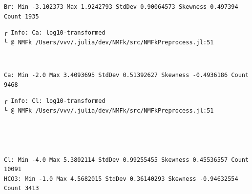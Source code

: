 \documentclass[11pt]{article}
\begin{document}
    \begin{Verbatim}[commandchars=\\\{\}]
Br: Min -3.102373 Max 1.9242793 StdDev 0.90064573 Skewness 0.497394 Count 1935
    \end{Verbatim}

    \begin{Verbatim}[commandchars=\\\{\}]
┌ Info: Ca: log10-transformed
└ @ NMFk /Users/vvv/.julia/dev/NMFk/src/NMFkPreprocess.jl:51
    \end{Verbatim}

    \begin{center}
    \end{center}
    { \hspace*{\fill} \\}

    \begin{Verbatim}[commandchars=\\\{\}]
Ca: Min -2.0 Max 3.4093695 StdDev 0.51392627 Skewness -0.4936186 Count 9468
    \end{Verbatim}

    \begin{Verbatim}[commandchars=\\\{\}]
┌ Info: Cl: log10-transformed
└ @ NMFk /Users/vvv/.julia/dev/NMFk/src/NMFkPreprocess.jl:51
    \end{Verbatim}

    \begin{center}
    \end{center}
    { \hspace*{\fill} \\}

    \begin{center}
    \end{center}
    { \hspace*{\fill} \\}

    \begin{Verbatim}[commandchars=\\\{\}]
Cl: Min -4.0 Max 5.3802114 StdDev 0.99255455 Skewness 0.45536557 Count 10091
HCO3: Min -1.0 Max 4.5682015 StdDev 0.36140293 Skewness -0.94632554 Count 3413
    \end{Verbatim}
\end{document}
